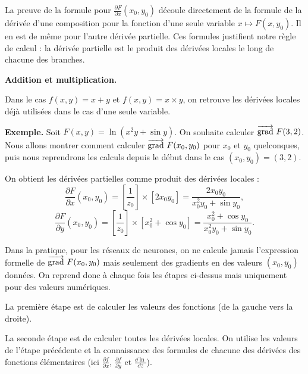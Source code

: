 La preuve de la formule pour $\frac{\partial F}{\partial x}(x_0,y_0)$ découle directement de la formule de la dérivée d'une composition pour la fonction d'une seule variable $x \mapsto F(x,y_0)$. Il en est de même pour l'autre dérivée partielle.
Ces formules justifient notre règle de calcul : la dérivée partielle est le produit des dérivées locales le long de chacune des branches.



\bigskip
\textbf{Addition et multiplication.}

Dans le cas $f(x,y) = x + y$ et $f(x,y)= x \times y$, on retrouve les dérivées locales déjà utilisées dans le cas d'une seule variable.




\bigskip
\textbf{Exemple.}
Soit $F(x,y) = \ln(x^2y+\sin y)$. On souhaite calculer $\overrightarrow{\textup{grad}}\  F(3,2)$.
Nous allons montrer comment calculer $\overrightarrow{\textup{grad}}\  F(x_0,y_0)$ pour $x_0$ et $y_0$ quelconques, puis nous reprendrons les calculs depuis le début dans le cas $(x_0,y_0)=(3,2)$.


On obtient les dérivées partielles comme produit des dérivées locales :
$$\frac{\partial F}{\partial x} (x_0,y_0) = \left[ \frac{1}{z_0} \right] \times [2x_0y_0] = \frac{2x_0y_0}{x_0^2y_0+\sin y_0},$$
$$\frac{\partial F}{\partial y} (x_0,y_0) = \left[ \frac{1}{z_0} \right] \times [x_0^2 + \cos y_0] = \frac{x_0^2 + \cos y_0}{x_0^2y_0+\sin y_0}.$$



Dans la pratique, pour les réseaux de neurones, on ne calcule jamais l'expression formelle de $\overrightarrow{\textup{grad}}\  F(x_0,y_0)$ mais seulement des gradients en des valeurs $(x_0,y_0)$ données. On reprend donc à chaque fois les étapes ci-dessus mais uniquement pour des valeurs numériques.



La première étape est de calculer les valeurs des fonctions (de la gauche vers la droite).

La seconde étape est de calculer toutes les dérivées locales. On utilise les valeurs de l'étape précédente et la connaissance des formules de chacune des dérivées des fonctions élémentaires (ici $\frac{\partial f}{\partial x}$, $\frac{\partial f}{\partial y}$ et $\frac{\dd \ln}{\dd z}$).

